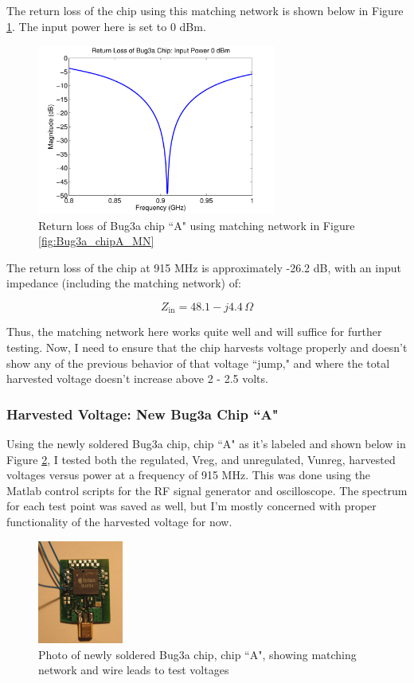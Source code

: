 \documentclass[12pt,onecolumn,titlepage]{article}
\begin{document}
The return loss of the chip using this matching network is shown below in Figure \ref{fig:Bug3a_chipA_RL}. The input power here is set to 0 dBm.


\begin{figure}[htbp]
	\centering
	\includegraphics[width=0.7\textwidth]{Pictures/5July2013/Bug3a_chipA_RL}
	\caption{ Return loss of Bug3a chip ``A" using matching network in Figure \ref{fig:Bug3a_chipA_MN} } 
	\label{fig:Bug3a_chipA_RL}
\end{figure}


The return loss of the chip at 915 MHz is approximately -26.2 dB, with an input impedance (including the matching network) of:

\[Z_{\text{in}} = 48.1 - j 4.4 \, \Omega \]

Thus, the matching network here works quite well and will suffice for further testing. Now, I need to ensure that the chip harvests voltage properly and doesn't show any of the previous behavior of that voltage ``jump," and where the total harvested voltage doesn't increase above 2 - 2.5 volts. 


\subsubsection{Harvested Voltage: New Bug3a Chip ``A"}
\indent \indent Using the newly soldered Bug3a chip, chip ``A" as it's labeled and shown below in Figure \ref{fig:Bug3a_chipA_cropped}, I tested both the regulated, Vreg, and unregulated, Vunreg, harvested voltages versus power at a frequency of 915 MHz. This was done using the Matlab control scripts for the RF signal generator and oscilloscope. The spectrum for each test point was saved as well, but I'm mostly concerned with proper functionality of the harvested voltage for now. 


\begin{figure}[htbp]
	\centering
	\includegraphics[width=0.25\textwidth]{Pictures/5July2013/Bug3a_chipA_cropped}
	\caption{ Photo of newly soldered Bug3a chip, chip ``A", showing matching network and wire leads to test voltages } 
	\label{fig:Bug3a_chipA_cropped}
\end{figure}
\end{document}
